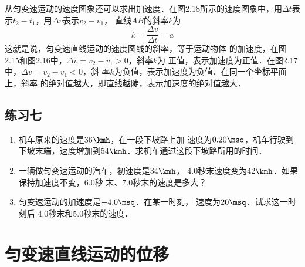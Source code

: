     从匀变速运动的速度图象还可以求出加速度．在图2.18所示的速度图象中，用$\Delta t$表示$t_2-t_1$，用$\Delta v$表示$v_2-v_1$，
直线$AB$的斜率$k$为
\[k=\frac{\Delta v}{\Delta t}=a \]
这就是说，匀变速直线运动的速度图线的斜率，等于运动物体
的加速度，在图2.15和图2.16中，$\Delta v=v_2-v_1>0$，斜率$k$为
正值，表示加速度为正值．在图2.17中，$\Delta v=v_2-v_1<0$，斜
率$k$为负值，表示加速度为负值．在同一个坐标平面上，斜率
的绝对值越大，即直线越陡，表示加速度的绝对值越大．

\subsection*{练习七}
\begin{enumerate}
\item 机车原来的速度是36$\kmh$，在一段下坡路上加
速度为$0.20\msq$，机车行驶到下坡末端，速度增加到54$\kmh$．求机车通过这段下坡路所用的时间．
\item 一辆做匀变速运动的汽车，初速度是34$\kmh$，
4.0秒末速度变为42$\kmh$．如果保持加速度不变，6.0秒
末、7.0秒末的速度是多大？
\item 匀变速运动的加速度是$-4.0\msq$．在某一时刻，
速度为$20\msq$．试求这一时刻后 4.0秒末和5.0秒末的速度．
\end{enumerate}

\section{匀变速直线运动的位移}
 

